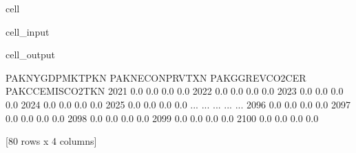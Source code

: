 \documentclass[letterpaper,10pt,english]{jupyterBook}
\begin{document}
\begin{sphinxuseclass}{cell}\begin{sphinxVerbatimInput}

\begin{sphinxuseclass}{cell_input}
\begin{sphinxVerbatim}[commandchars=\\\{\}]
   

\PYG{p}{[}\PYG{p}{]}
\end{sphinxVerbatim}

\end{sphinxuseclass}\end{sphinxVerbatimInput}
\begin{sphinxVerbatimOutput}

\begin{sphinxuseclass}{cell_output}
\begin{sphinxVerbatim}[commandchars=\\\{\}]
      PAKNYGDPMKTPKN  PAKNECONPRVTXN  PAKGGREVCO2CER  PAKCCEMISCO2TKN
2021             0.0             0.0            \PYGZhy{}0.0              0.0
2022             0.0             0.0            \PYGZhy{}0.0              0.0
2023             0.0             0.0            \PYGZhy{}0.0              0.0
2024             0.0             0.0            \PYGZhy{}0.0              0.0
2025             0.0             0.0            \PYGZhy{}0.0              0.0
...              ...             ...             ...              ...
2096             0.0             0.0            \PYGZhy{}0.0              0.0
2097             0.0             0.0            \PYGZhy{}0.0              0.0
2098             0.0             0.0            \PYGZhy{}0.0              0.0
2099             0.0             0.0            \PYGZhy{}0.0              0.0
2100             0.0             0.0            \PYGZhy{}0.0              0.0

[80 rows x 4 columns]
\end{sphinxVerbatim}

\end{sphinxuseclass}\end{sphinxVerbatimOutput}

\end{sphinxuseclass}
\end{document}

